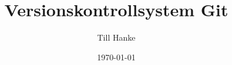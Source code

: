 \documentclass[a4paper]{article}
\title{Versionskontrollsystem Git}\let\Title\@title
\author{Till Hanke}          \let\Author\@author
\date{\today}           \let\Date\@date
\begin{document}

\newpage
\tableofcontents
\newpage


\newpage

%
\newpage

%
\newpage

%
\newpage

%
\newpage
\nocite{*}

\printbibliography
\end{document}
